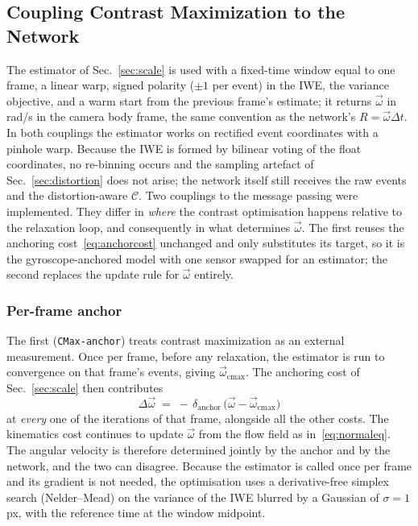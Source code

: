 \documentclass[journal]{IEEEtran}
\newcommand{\Cmat}{\mathcal{C}}
\newcommand{\wvec}{\vec{\omega}}
\begin{document}
\subsection{Coupling Contrast Maximization to the Network}
\label{sec:coupling}

The estimator of Sec.~\ref{sec:scale} is used with a fixed-time window equal to
one frame, a linear warp, signed polarity ($\pm1$ per event) in the IWE, the
variance objective, and a warm start from the previous frame's estimate; it
returns $\wvec$ in rad/s in the camera body frame, the same convention as the
network's $R = \wvec\Delta t$. In both couplings the estimator works on
rectified event coordinates with a pinhole warp. Because the IWE is formed by
bilinear voting of the float coordinates, no re-binning occurs and the sampling
artefact of Sec.~\ref{sec:distortion} does not arise; the network itself still
receives the raw events and the distortion-aware $\Cmat$. Two couplings to the
message passing were implemented. They
differ in \emph{where} the contrast optimisation happens relative to the
relaxation loop, and consequently in what determines $\wvec$. The first reuses
the anchoring cost~\eqref{eq:anchorcost} unchanged and only substitutes its
target, so it is the gyroscope-anchored model with one sensor swapped for an
estimator; the second replaces the update rule for $\wvec$ entirely.

\subsubsection{Per-frame anchor}
The first (\texttt{CMax-anchor}) treats contrast maximization as an external
measurement. Once per frame, before any relaxation, the estimator is run to
convergence on that frame's events, giving $\wvec_{\text{cmax}}$. The anchoring
cost of Sec.~\ref{sec:scale} then contributes
\begin{equation}
\Delta \wvec \;=\; -\,\delta_{\text{anchor}}\,\big(\wvec - \wvec_{\text{cmax}}\big)
\label{eq:anchor}
\end{equation}
at \emph{every} one of the iterations of that frame, alongside all the other
costs. The kinematics cost continues to update $\wvec$ from the flow field as
in~\eqref{eq:normaleq}. The angular velocity is therefore determined jointly by
the anchor and by the network, and the two can disagree. Because the estimator is
called once per frame and its gradient is not needed, the optimisation uses a
derivative-free simplex search (Nelder--Mead) on the variance of the IWE
blurred by a Gaussian of $\sigma = 1$\,px, with the reference time at the
window midpoint.
\end{document}
